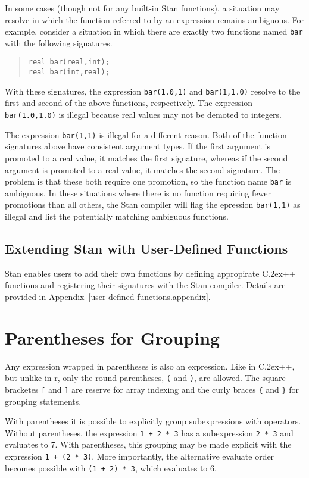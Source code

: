 \documentclass[10pt]{report}
\newcommand{\Stan}{Stan\xspace}
\newcommand*{\Cpp}{C\raise.2ex\hbox{\footnotesize ++}\xspace} %
\newcommand{\acronym}[1]{{\sc #1}\xspace}
\newcommand{\R}{\acronym{r}}
\newcommand{\code}[1]{{\tt #1}}
\newcommand{\refappendix}[1]{Appendix~\ref{#1.appendix}}
\begin{document}
In some cases (though not for any built-in \Stan functions), a
situation may resolve in which the function referred to by an
expression remains ambiguous.  For example, consider a situation in
which there are exactly two functions named \code{bar} with the
following signatures.
%
\begin{quote}
\code{real bar(real,int);}
\\
\code{real bar(int,real);}
\end{quote}
%
With these signatures, the expression \code{bar(1.0,1)} and
\code{bar(1,1.0)} resolve to the first and second of the above
functions, respectively.  The expression \code{bar(1.0,1.0)} is
illegal because real values may not be demoted to integers.  

The expression \code{bar(1,1)} is illegal for a different reason.
Both of the function signatures above have consistent argument types.
If the first argument is promoted to a real value, it matches the
first signature, whereas if the second argument is promoted to a real
value, it matches the second signature.  The problem is that these
both require one promotion, so the function name \code{bar} is
ambiguous.  In these situations where there is no function requiring
fewer promotions than all others, the \Stan compiler will flag the
epression \code{bar(1,1)} as illegal and list the potentially matching
ambiguous functions.


\subsection{Extending \Stan with User-Defined Functions}

\Stan enables users to add their own functions by defining appropirate
\Cpp functions and registering their signatures with the \Stan
compiler.  Details are provided in \refappendix{user-defined-functions}.


\section{Parentheses for Grouping}

Any expression wrapped in parentheses is also an expression. Like in
\Cpp, but unlike in \R, only the round parentheses, \code{(} and
\code{)}, are allowed.  The square bracketes \code{[} and \code{]} are
reserve for array indexing and the curly braces \code{\{} and
\code{\}} for grouping statements.

With parentheses it is possible to explicitly group subexpressions
with operators.  Without parentheses, the expression \code{1 + 2 * 3}
has a subexpression \code{2 * 3} and evaluates to 7.  With
parentheses, this grouping may be made explicit with the expression
\code{1 + (2 * 3)}.  More importantly, the alternative evaluate order
becomes possible with \code{(1 + 2) * 3}, which evaluates to 6.
\end{document}
